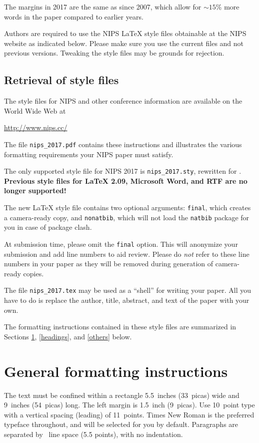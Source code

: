 \documentclass{article}
\begin{document}
The margins in 2017 are the same as since 2007, which allow for
$\sim$$15\%$ more words in the paper compared to earlier years.

Authors are required to use the NIPS \LaTeX{} style files obtainable
at the NIPS website as indicated below. Please make sure you use the
current files and not previous versions. Tweaking the style files may
be grounds for rejection.

\subsection{Retrieval of style files}

The style files for NIPS and other conference information are
available on the World Wide Web at
\begin{center}
  \url{http://www.nips.cc/}
\end{center}
The file \verb+nips_2017.pdf+ contains these instructions and
illustrates the various formatting requirements your NIPS paper must
satisfy.

The only supported style file for NIPS 2017 is \verb+nips_2017.sty+,
rewritten for \LaTeXe{}.  \textbf{Previous style files for \LaTeX{}
  2.09, Microsoft Word, and RTF are no longer supported!}

The new \LaTeX{} style file contains two optional arguments:
\verb+final+, which creates a camera-ready copy, and \verb+nonatbib+,
which will not load the \verb+natbib+ package for you in case of
package clash.

At submission time, please omit the \verb+final+ option. This will
anonymize your submission and add line numbers to aid review.  Please
do \emph{not} refer to these line numbers in your paper as they will
be removed during generation of camera-ready copies.

The file \verb+nips_2017.tex+ may be used as a ``shell'' for writing
your paper. All you have to do is replace the author, title, abstract,
and text of the paper with your own.

The formatting instructions contained in these style files are
summarized in Sections \ref{gen_inst}, \ref{headings}, and
\ref{others} below.

\section{General formatting instructions}
\label{gen_inst}

The text must be confined within a rectangle 5.5~inches (33~picas)
wide and 9~inches (54~picas) long. The left margin is 1.5~inch
(9~picas).  Use 10~point type with a vertical spacing (leading) of
11~points.  Times New Roman is the preferred typeface throughout, and
will be selected for you by default.  Paragraphs are separated by
~line space (5.5 points), with no indentation.
\end{document}
